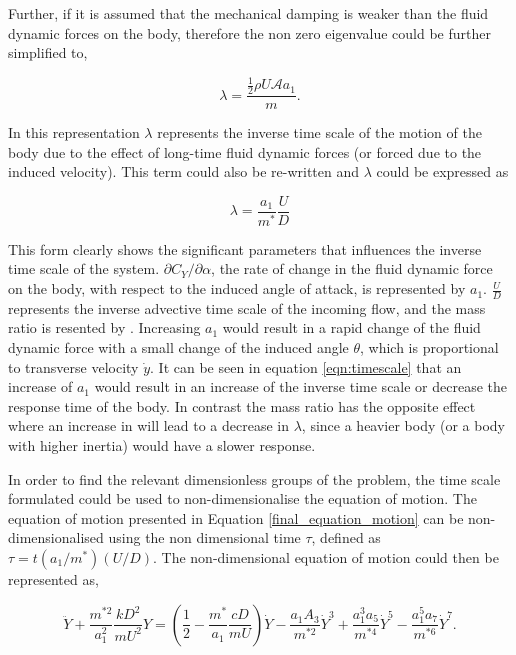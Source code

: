   Further, if it is assumed that the mechanical damping is weaker than the fluid dynamic forces on the body, therefore the non zero eigenvalue could be further simplified to,
  
 \begin{equation}
 \label{eqn:eigs_nospring_nodamp}
 \lambda=\frac{\frac{1}{2}\rho U\mathcal{A}a_1}{m}.
 \end{equation}  

In this representation $\lambda$ represents the inverse time scale of the motion of the body due to the effect of long-time fluid dynamic forces (or forced due to the induced velocity). This term could also be re-written and $\lambda$ could be expressed as 

\begin{equation}
\label{eqn:timescale}
\lambda = \frac{a_1}{m^*}\frac{U}{D}
\end{equation}

This form clearly shows the significant parameters that influences the inverse time scale of the system. $\partial C_Y / \partial \alpha $, the rate of change in the fluid dynamic force on the body, with respect to the induced angle of attack, is represented by $a_1$. $\frac{U}{D}$ represents the inverse advective time scale of the incoming flow, and the mass ratio is resented by \mstar. Increasing $a_1$ would result in a rapid change of the fluid dynamic force with a small change of the induced angle $\theta$, which is proportional to transverse velocity $\dot{y}$. It can be seen in equation \ref{eqn:timescale} that an increase of $a_{1}$ would result in an increase of the inverse time scale or decrease the response time of the body. In contrast the mass ratio has the opposite effect where an increase in \mstar will lead to a decrease in $\lambda$, since a heavier body (or a body with higher inertia) would have a slower response. 

In order to find the relevant dimensionless groups of the problem, the time scale formulated could be used to non-dimensionalise the equation of motion. The equation of motion presented in Equation \ref{final_equation_motion} can be non-dimensionalised using the non dimensional time $\tau$, defined as $\tau=t(a_1/m^*)(U/D)$. The non-dimensional equation of motion could then be represented as, 

 \begin{equation}
 \label{eqn:eom_nondim}
 \ddot{Y} + \frac{m^{*2}}{a_1^2}\frac{kD^2}{mU^2}Y = \left(\frac{1}{2} - \frac{m^*}{a_1}\frac{cD}{mU}\right)\dot{Y} - \frac{a_1A_3}{m^{*2}}\dot{Y}^3 + \frac{a_1^3a_5}{m^{*4}}\dot{Y}^5 - \frac{a_1^5a_7}{m^{*6}}\dot{Y}^7.
 \end{equation}
 
